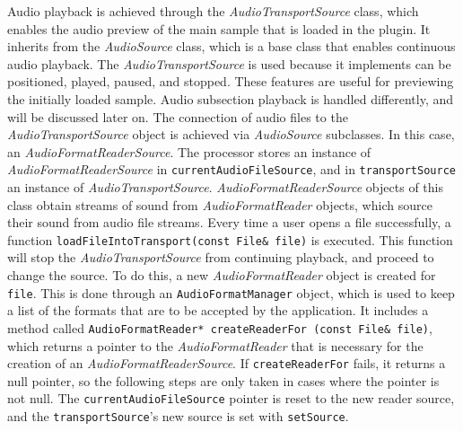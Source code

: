 \documentclass[12pt, a4paper, hidelinks]{article}
\begin{document}
	Audio playback is achieved through the \textit{AudioTransportSource} class, which enables the audio preview of the main sample that is loaded in the plugin. It inherits from the \textit{AudioSource} class, which is a base class that enables continuous audio playback. The \textit{AudioTransportSource} is used because it implements can be positioned, played, paused, and stopped. These features are useful for previewing the initially loaded sample. Audio subsection playback is handled differently, and will be discussed later on. The connection of audio files to the \textit{AudioTransportSource} object is achieved via \textit{AudioSource} subclasses. In this case, an \textit{AudioFormatReaderSource}. The processor stores an instance of \textit{AudioFormatReaderSource} in \texttt{currentAudioFileSource}, and in \texttt{transportSource} an instance of \textit{AudioTransportSource}. \textit{AudioFormatReaderSource} objects of this class obtain streams of sound from \textit{AudioFormatReader} objects, which source their sound from audio file streams. Every time a user opens a file successfully, a function \texttt{loadFileIntoTransport(const File\& file)} is executed. This function will stop the \textit{AudioTransportSource} from continuing playback, and proceed to change the source. To do this, a new \textit{AudioFormatReader} object is created for \texttt{file}. This is done through an \texttt{AudioFormatManager} object, which is used to keep a list of the formats that are to be accepted by the application. It includes a method called \texttt{AudioFormatReader* createReaderFor (const File\& file)}, which returns a pointer to the \textit{AudioFormatReader} that is necessary for the creation of an \textit{AudioFormatReaderSource}. If \texttt{createReaderFor} fails, it returns a null pointer, so the following steps are only taken in cases where the pointer is not null. The \texttt{currentAudioFileSource} pointer is reset to the new reader source, and the \texttt{transportSource}'s new source is set with \texttt{setSource}.\\
\end{document}
